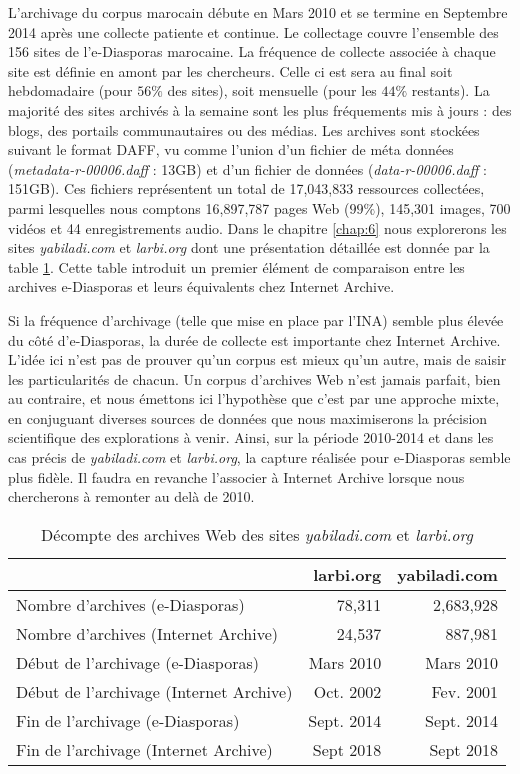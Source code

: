\documentclass[symmetric,justified,marginals=raggedouter]{tufte-book}
\begin{document}
L'archivage du corpus marocain débute en Mars 2010 et se termine en Septembre 2014 après une collecte patiente et continue. Le collectage couvre l'ensemble des 156 sites de l'e-Diasporas marocaine. La fréquence de collecte associée à chaque site est définie en amont par les chercheurs. Celle ci est sera au final soit hebdomadaire (pour $56\%$ des sites), soit mensuelle (pour les $44\%$ restants). La majorité des sites archivés à la semaine sont les plus fréquements mis à jours : des blogs, des portails communautaires ou des médias. Les archives sont stockées suivant le format DAFF, vu comme l'union d'un fichier de méta données (\textit{metadata-r-00006.daff} : 13GB) et d'un fichier de données (\textit{data-r-00006.daff} : 151GB). Ces fichiers représentent un total de 17,043,833 ressources collectées, parmi lesquelles nous comptons 16,897,787 pages Web ($99\%$), 145,301 images, 700 vidéos et 44 enregistrements audio. Dans le chapitre \ref{chap:6} nous explorerons les sites \textit{yabiladi.com} et \textit{larbi.org} dont une présentation détaillée est donnée par la table \ref{tab:detail-archive}. Cette table introduit un premier élément de comparaison entre les archives e-Diasporas et leurs équivalents chez Internet Archive.

Si la fréquence d'archivage (telle que mise en place par l'INA) semble plus élevée du côté d'e-Diasporas, la durée de collecte est importante chez Internet Archive. L'idée ici n'est pas de prouver qu'un corpus est mieux qu'un autre, mais de saisir les particularités de chacun. Un corpus d'archives Web n'est jamais parfait, bien au contraire, et nous émettons ici l'hypothèse que c'est par une approche mixte, en conjuguant diverses sources de données que nous maximiserons la précision scientifique des explorations à venir. Ainsi, sur la période 2010-2014 et dans les cas précis de \textit{yabiladi.com} et \textit{larbi.org}, la capture réalisée pour e-Diasporas semble plus fidèle. Il faudra en revanche l'associer à Internet Archive lorsque nous chercherons à remonter au delà de 2010. 

\begin{table}
  \label{tab:detail-archive}
  \begin{tabular}{lrr}
    \toprule
    &larbi.org&yabiladi.com\\
    \midrule
    Nombre d'archives (e-Diasporas)  & 78,311 & 2,683,928\\
    Nombre d'archives (Internet Archive) & 24,537 & 887,981\\
    \midrule
    Début de l'archivage  (e-Diasporas) & Mars 2010 & Mars 2010\\
    Début de l'archivage  (Internet Archive) & Oct. 2002 & Fev. 2001\\
    \midrule
    Fin de l'archivage  (e-Diasporas) & Sept. 2014 & Sept. 2014\\
    Fin de l'archivage  (Internet Archive) & Sept 2018 & Sept 2018\\    
  \bottomrule
\end{tabular}
  \bigskip
  \caption{Décompte des archives Web des sites \textit{yabiladi.com} et \textit{larbi.org}}
\end{table} 
\end{document}
